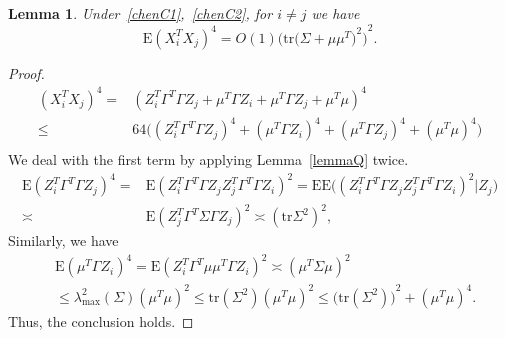 \documentclass[review]{elsarticle}
\theoremstyle{plain}
\newtheorem{lemma}{Lemma}
\theoremstyle{definition}
\theoremstyle{remark}
\begin{document}
\begin{lemma}\label{smallLemma1}
    Under~\eqref{chenC1},~\eqref{chenC2}, for $i\neq j$ we have
    \begin{equation}\label{eq:20170220}
        \mathrm{E}{(X_i^T X_j)}^4=%
             O(1){\Big(\mathrm{tr}{\big(\Sigma+\mu\mu^T\big)}^2\Big)}^2.
    \end{equation}
\end{lemma}
\begin{proof}
    \begin{equation}
        \begin{aligned}
            {(X_i^T X_j)}^4=&
            {(Z_i^T \Gamma^T \Gamma Z_j+\mu^T \Gamma Z_i+\mu^T \Gamma Z_j+\mu^T \mu)}^4\\
            \leq &
            64\big((Z_i^T \Gamma^T \Gamma Z_j)^4+(\mu^T \Gamma Z_i)^4+(\mu^T \Gamma Z_j)^4+(\mu^T \mu)^4\big)\\
        \end{aligned}
    \end{equation}
    We deal with the first term by applying Lemma~\ref{lemmaQ} twice.
    \begin{equation}
        \begin{aligned}
            \mathrm{E}(Z_i^T \Gamma^T \Gamma Z_j)^4=&
        \mathrm{E}(Z_i^T \Gamma^T \Gamma Z_j Z_j^T \Gamma^T \Gamma Z_i)^2
            =
            \mathrm{E}\mathrm{E}\big((Z_i^T \Gamma^T \Gamma Z_j Z_j^T \Gamma^T \Gamma Z_i)^2 | Z_j\big)\\
            \asymp &  \mathrm{E}{(Z_j^T \Gamma^T \Sigma \Gamma Z_j)}^2
            \asymp   {(\mathrm{tr}\Sigma^2)}^2,%
        \end{aligned}
    \end{equation}
    Similarly, we have
    \begin{equation}
        \begin{aligned}
            &\mathrm{E}(\mu^T \Gamma Z_i)^4=
        \mathrm{E}(Z_i^T \Gamma^T \mu\mu^T \Gamma Z_i)^2
            \asymp  {(\mu^T \Sigma \mu)}^2\\
            &\leq \lambda_{\max}^2(\Sigma){(\mu^T \mu)}^2
        \leq \mathrm{tr}(\Sigma^2){(\mu^T \mu)}^2
            \leq {\big(\mathrm{tr}(\Sigma^2)\big)}^2+{(\mu^T \mu)}^4.
        \end{aligned}
    \end{equation}
    Thus, the conclusion holds.
\end{proof}
\end{document}
